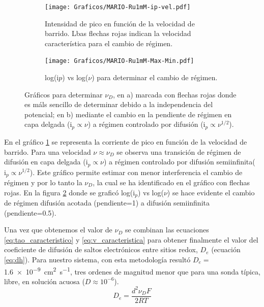          	 \begin{figure}[ht]
			 	 \begin{subfigure}[t]{0.5\textwidth}
			 	 \texttt{[image: Graficos/MARIO-Ru1mM-ip-vel.pdf]}
				  \caption{Intensidad de pico  en función de la velocidad de barrido. Lbas flechas rojas indican la velocidad característica para el cambio de régimen.}
			 	 \label{fig:ip-vel}
		  	  	 \end{subfigure}	
			 	 \begin{subfigure}[t]{0.5\textwidth}
			  	 \texttt{[image: Graficos/MARIO-Ru1mM-Max-Min.pdf]}
			  	 \caption{log(i$p$) vs log($\nu$) para determinar el cambio de régimen.}
			 	 \label{fig:logj-logv}
		  		 \end{subfigure}
				  \caption[Cálculo de velocidad de barrido característica]{Gráficos para determinar $\nu_{\scriptscriptstyle{D}}$, en a) marcada con flechas rojas donde es máls sencillo de determinar debido a la independencia del potencial; en b) mediante el cambio en la pendiente de  régimen en capa delgada ($\text{i}_{p} \propto \nu$) a régimen controlado por difusión ($\text{i}_{p} \propto \nu^{1/2}$).}
			 	 \label{fig:ip-vel2}
			 	 \end{figure}

         En el gráfico \ref{fig:ip-vel} se representa la corriente de pico en función de la velocidad de barrido. Para una velocidad $\nu \approx \nu_{\scriptscriptstyle{D}}$ se observa una transición de régimen de difusión en capa delgada ($\text{i}_{p} \propto \nu$) a régimen controlado por difusión semiinfinita($\text{i}_{p} \propto \nu^{1/2}$). Este gráfico permite estimar con menor interferencia el cambio de régimen y por lo tanto la $\nu_{\scriptscriptstyle{D}}$, la cual se ha identificado en el gráfico con flechas rojas. En la figura \ref{fig:logj-logv} donde se graficó log({i$_p$}) vs log({$\nu$}) se hace evidente el cambio de régimen difusión acotada (pendiente=1) a difusión semiinfinita (pendiente=0.5).

		 Una vez que obtenemos el valor de  $\nu_{\scriptscriptstyle{D}}$ se combinan las ecuaciones \ref{eq:tao_caracteristico} y \ref{eq:v_caracteristica} para obtener finalmente el valor del coeficiente de difusión de saltos electrónicos entre sitios redox,  $D_e$ (ecuación \ref{eq:dh}). Para nuestro sistema, con esta metodología resultó $D_e=$\SI{1.6e-9}{\square\cm\per\second}, tres ordenes de magnitud menor que para una sonda típica, libre, en solución acuosa ($D\approx 10^{-6}$).  
			\begin{equation}
					D_e= \frac{d^2\nu_{\scriptscriptstyle{D}}F}{2RT}
					\label{eq:dh}
			\end{equation}
     
